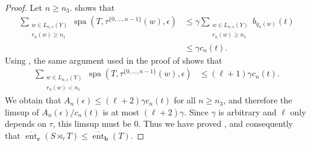 \documentclass[a4paper,oneside]{amsart}
\renewcommand{\(}{\begin{dmath*}}
\renewcommand{\)}{\end{dmath*}}
\theoremstyle{definition}
\newcommand{\upperent}{\overline{\operatorname{ent}}}
\newcommand{\spa}{\operatorname{spa}}
\begin{document}
\begin{proof}
Let $n\geq n_3$.   shows that 
\begin{align*}
\sum_{\substack{w\in L_{n,s}(Y)\\ r_n(w)\geq n_1}}\spa(T,\tau^{\{0,\dots,n-1\}}(w),\epsilon)&\leq \gamma\sum_{\substack{w\in L_{n,s}(Y)\\ r_n(w)\geq n_1}} b_{q_n(w)}(t) \\ &\leq \gamma c_n(t).
\end{align*}
Using , the same argument used in the proof of  shows that
\begin{align*}
\sum_{\substack{w\in L_{n,s}(Y)\\ r_n(w)< n_1}}\spa(T,\tau^{\{0,\dots,n-1\}}(w),\epsilon)&\leq (\ell+1)\gamma c_n(t).
\end{align*}
We obtain that   $A_n(\epsilon)\leq (\ell+2)\gamma c_n(t)$ for all $n\geq n_3$, and therefore the limsup of $A_n(\epsilon)/c_n(t)$ is at most $(\ell+2)\gamma$. 
Since $\gamma$ is arbitrary and $\ell$ only depends on $\tau$, this limsup must be $0$. Thus we have proved , and consequently that $\upperent_{\textbf{c}}(S\rtimes_\tau T)\leq \upperent_{\textbf{b}}(T)$. 


\end{proof}
\end{document}
